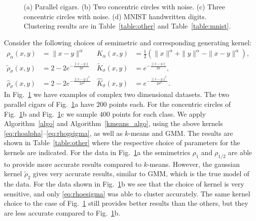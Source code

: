\documentclass[aps,preprint,nofootinbib,floatfix]{revtex4-1}
\newcommand\kk{K}
\begin{document}
\begin{figure}
\begin{minipage}{0.23\textwidth}
\end{minipage}
\caption{\label{fig:other}
(a) Parallel cigars. (b) Two  
concentric circles with noise. (c) Three
concentric circles with noise. (d) MNIST handwritten digits.
Clustering results are in Table~\ref{table:other}
and Table~\ref{table:mnist}.
}
\end{figure}

Consider the following choices of semimetric and 
corresponding generating kernel:
\begin{align}
\rho_{\alpha}(x,y) &= \| x - y\|^\alpha & 
\kk_{\alpha}(x,y) &= \tfrac{1}{2}\left(
\| x \|^\alpha +
\| y \|^\alpha -
\| x-y \|^\alpha \right) ,
\label{eq:rhoalpha} \\
%
\widetilde{\rho}_{\sigma}(x,y) &= 2 - 2 e^{-\tfrac{\|x-y\|}{2 \sigma}} &
\widetilde{\kk}_{\sigma}(x,y) &= e^{-\tfrac{\|x-y\|}{2\sigma}} ,
\label{eq:rhoesigma} \\
%
\widehat{\rho}_{\sigma}(x,y) &= 2 - 2 e^{-\tfrac{\|x-y\|^2}{2 \sigma^2}} &
\widehat{\kk}_{\sigma}(x,y) &= e^{-\tfrac{\|x-y\|^2}{2\sigma^2}} .
\label{eq:rhogsigma} 
\end{align}
In Fig.~\ref{fig:other} we have examples of
complex two dimensional datasets. The two parallel cigars of 
Fig.~\ref{fig:other}a have $200$ points each. For the concentric circles
of Fig.~\ref{fig:other}b and Fig.~\ref{fig:other}c we
sample $400$ points for each class.
We apply Algorithm~\ref{algo} and Algorithm~\ref{kmeans_algo}, using the above kernels 
\eqref{eq:rhoalpha}--\eqref{eq:rhogsigma}, as well as
$k$-means and GMM. The results are shown
in Table~\ref{table:other} where the respective choice of parameters for the
kernels are indicated. For the data in Fig.~\ref{fig:other}a 
the semimetrics $\rho_1$ and $\rho_{1/2}$ are
able to provide more accurate results compared to $k$-means. However,
the gaussian kernel $\widetilde{\rho}_2$ gives very accurate
results, similar to GMM,
which is the true model of the data. For the data shown in
Fig.~\ref{fig:other}b we see
that the choice of kernel is very sensitive, 
and only \eqref{eq:rhoesigma}
was able to cluster accurately. The same kernel choice to the case
of Fig.~\ref{fig:other} 
still provides better results than
the others, but they are less accurate compared to Fig.~\ref{fig:other}b.
\end{document}

